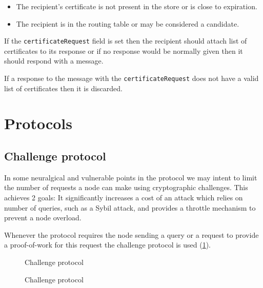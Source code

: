 \begin{itemize}
  \item The recipient's certificate is not present in the store or is close to
    expiration.
  \item The recipient is in the routing table or may be considered a candidate.
\end{itemize}

If the \texttt{certificateRequest} field is set then the recipient should attach
list of certificates to its response or if no response would be normally given
then it should respond with a  message.

If a response to the message with the \texttt{certificateRequest} does not have
a valid list of certificates then it is discarded.

\section{Protocols}
\subsection{Challenge protocol}
In some neuralgical and vulnerable points in the protocol we may intent to limit
the number of requests a node can make using cryptographic challenges. This
achieves 2 goals: It significantly increases a cost of an attack which relies on
number of queries, such as a Sybil attack, and provides a throttle mechanism to
prevent a node overload.

Whenever the protocol requires the node sending a query or a request to provide
a proof-of-work for this request the challenge protocol is used
(\ref{fig:chal_prot}).

\begin{figure}
\begin{msc}{Challenge protocol}
\setlength{\instdist}{9cm}
\setlength{\envinstdist}{3cm}
\nextlevel
{}
\nextlevel[11]
\nextlevel[1]
\nextlevel[4]
\nextlevel
{}
\nextlevel[4]
\end{msc}
  \caption{Challenge protocol}
  \label{fig:chal_prot}
\end{figure}


